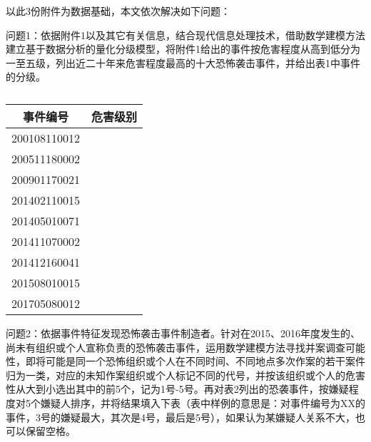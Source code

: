 \documentclass[bwprint]{gmcmthesis}
\begin{document}
以此3份附件为数据基础，本文依次解决如下问题：

问题1：依据附件1以及其它有关信息，结合现代信息处理技术，借助数学建模方法建立基于数据分析的量化分级模型，将附件1给出的事件按危害程度从高到低分为一至五级，列出近二十年来危害程度最高的十大恐怖袭击事件，并给出表1中事件的分级。

\begin{table}[htbp]
	\centering
	\caption{}
	\begin{tabular}{|c|c|}
		\hline
		\multicolumn{1}{|p{6em}|}{事件编号} & \multicolumn{1}{p{2.5em}|}{危害级别} \\
		\hline
		200108110012 &  \\
		\hline
		200511180002 &  \\
		\hline
		200901170021 &  \\
		\hline
		201402110015 &  \\
		\hline
		201405010071 &  \\
		\hline
		201411070002 &  \\
		\hline
		201412160041 &  \\
		\hline
		201508010015 &  \\
		\hline
		201705080012 &  \\
		\hline
	\end{tabular}
	\label{tab:addlabel}
\end{table}%

问题2：依据事件特征发现恐怖袭击事件制造者。针对在2015、2016年度发生的、尚未有组织或个人宣称负责的恐怖袭击事件，运用数学建模方法寻找并案调查可能性，即将可能是同一个恐怖组织或个人在不同时间、不同地点多次作案的若干案件归为一类，对应的未知作案组织或个人标记不同的代号，并按该组织或个人的危害性从大到小选出其中的前5个，记为1号-5号。再对表2列出的恐袭事件，按嫌疑程度对5个嫌疑人排序，并将结果填入下表（表中样例的意思是：对事件编号为XX的事件，3号的嫌疑最大，其次是4号，最后是5号），如果认为某嫌疑人关系不大，也可以保留空格。
\end{document}
